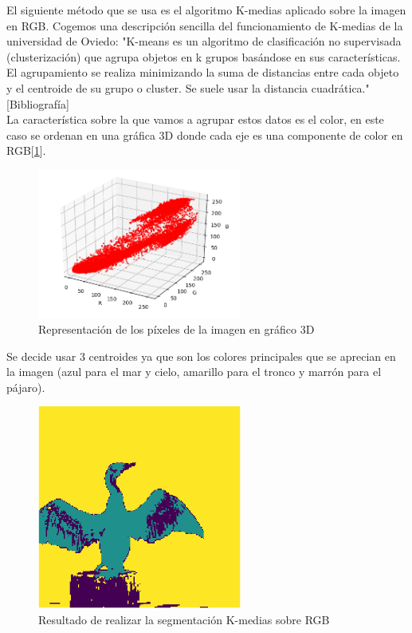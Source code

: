 \documentclass[a4paper,12pt]{report}
\begin{document}
El siguiente método que se usa es el algoritmo K-medias aplicado sobre la imagen en RGB. Cogemos una descripción sencilla del funcionamiento de K-medias de la universidad de Oviedo: "K-means es un algoritmo de clasificación no supervisada (clusterización) que agrupa objetos en k grupos basándose en sus características. El agrupamiento se realiza minimizando la suma de distancias entre cada objeto y el centroide de su grupo o cluster. Se suele usar la distancia cuadrática."[Bibliografía]\\

La característica sobre la que vamos a agrupar estos datos es el color, en este caso se ordenan en una gráfica 3D donde cada eje es una componente de color en RGB[\ref{cormoranrgb}].\\

\begin{figure}[h]
\centering
\includegraphics[width=0.6\textwidth]{imagenes/cormoranrgb}
\caption{Representación de los píxeles de la imagen en gráfico 3D}
\label{cormoranrgb}
\end{figure}

 Se decide usar 3 centroides ya que son los colores principales que se aprecian en la imagen (azul para el mar y cielo, amarillo para el tronco y marrón para el pájaro).\\

\begin{figure}[h]
\centering
\includegraphics[width=0.6\textwidth]{imagenes/segmentacionrgb}
\caption{Resultado de realizar la segmentación K-medias sobre RGB}
\label{segmentacionrgb}
\end{figure}
\end{document}
